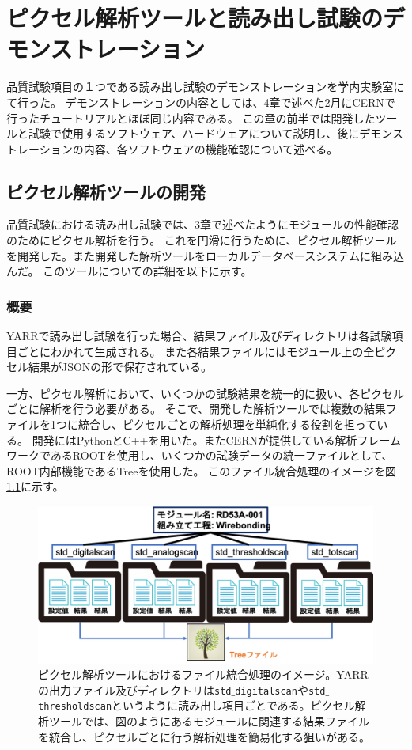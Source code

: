 \chapter{ピクセル解析ツールと読み出し試験のデモンストレーション}
品質試験項目の１つである読み出し試験のデモンストレーションを学内実験室にて行った。
デモンストレーションの内容としては、4章で述べた2月にCERNで行ったチュートリアルとほぼ同じ内容である。
この章の前半では開発したツールと試験で使用するソフトウェア、ハードウェアについて説明し、後にデモンストレーションの内容、各ソフトウェアの機能確認について述べる。

\section{ピクセル解析ツールの開発}
品質試験における読み出し試験では、3章で述べたようにモジュールの性能確認のためにピクセル解析を行う。
これを円滑に行うために、ピクセル解析ツールを開発した。また開発した解析ツールをローカルデータベースシステムに組み込んだ。
このツールについての詳細を以下に示す。

\subsection{概要}
YARRで読み出し試験を行った場合、結果ファイル及びディレクトリは各試験項目ごとにわかれて生成される。
また各結果ファイルにはモジュール上の全ピクセル結果がJSONの形で保存されている。

一方、ピクセル解析において、いくつかの試験結果を統一的に扱い、各ピクセルごとに解析を行う必要がある。
そこで、開発した解析ツールでは複数の結果ファイルを1つに統合し、ピクセルごとの解析処理を単純化する役割を担っている。
開発にはPythonとC++を用いた。またCERNが提供している解析フレームワークであるROOT\cite{5-5}を使用し、いくつかの試験データの統一ファイルとして、ROOT内部機能であるTreeを使用した。
このファイル統合処理のイメージを図\ref{analysis_tool_motivation}に示す。

\begin{figure}[bpt]\centering
\includegraphics[width=12cm]{analysis_tool_motivation}
\caption[ピクセル解析ツールにおけるファイル統合処理のイメージ]{ピクセル解析ツールにおけるファイル統合処理のイメージ。YARRの出力ファイル及びディレクトリは\texttt{std$\_$digitalscan}や\texttt{std$\_$thresholdscan}というように読み出し項目ごとである。ピクセル解析ツールでは、図のようにあるモジュールに関連する結果ファイルを統合し、ピクセルごとに行う解析処理を簡易化する狙いがある。}
\label{analysis_tool_motivation}
\end{figure}

